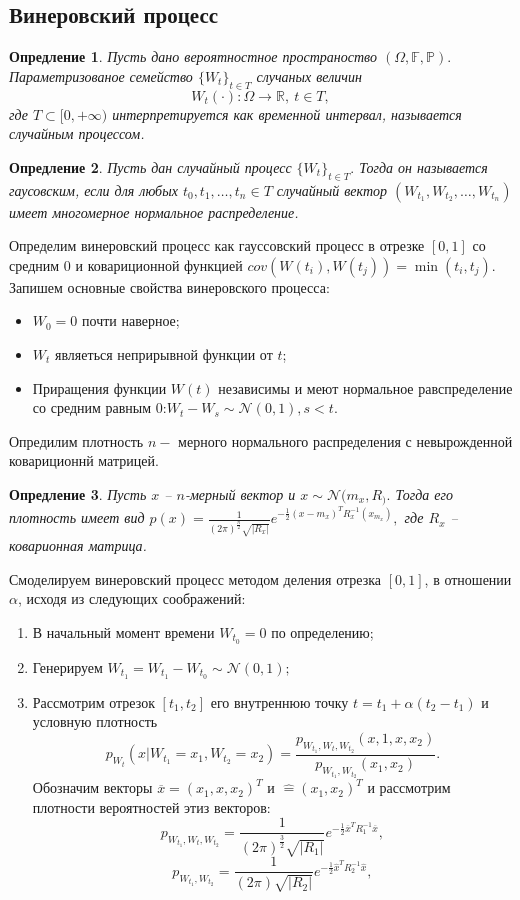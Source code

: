 \documentclass[11pt]{article}
\newtheorem{definition}{Опредление}
\numberwithin{equation}{section}
\begin{document}
\subsection{Винеровский процесс}
\begin{definition}
  Пусть дано вероятностное пространоство $(\Omega, \mathbb{F}, \mathbb{P}).$
  Параметризованое семейство $\{ W_t\}_{t \in T}$ случаных величин 
  $$ W_t(\cdot) : \Omega \to \mathbb{R}, \ t \in T,$$
  где $T \subset [0, +\infty)$ интерпретируется как временной интервал, называется случайным процессом.
\end{definition}
\begin{definition}
  Пусть дан случайный процесс $\{ W_t\}_{t \in T}.$ Тогда он называется гаусовским, если для любых 
  $t_0, t_1, \dots, t_n \in T$ случайный вектор $(W_{t_1}, W_{t_2}, \dots, W_{t_n})$ имеет многомерное нормальное распределение.
\end{definition}
Определим винеровский процесс как гауссовский процесс в отрезке $[0,1]$ со средним 0 
и ковариционной функцией $cov(W(t_i),W(t_j)) = \min(t_i,t_j).$
Запишем основные свойства винеровского процесса:
\begin{itemize}
  \item $W_0 = 0$ почти наверное;
  \item $W_t$ являеться неприрывной функции от $t$;
  \item Приращения функции $W(t)$ независимы и меют нормальное равспределение со средним равным 0:$W_t - W_s \sim \mathcal{N}(0,1), s<t.$
\end{itemize}
Опредилим плотность $n-$ мерного нормального распределения с невырожденной ковариционнй матрицей.
\begin{definition}
  Пусть $x$ -- $n$-мерный вектор и $x \sim \mathcal{N}(m_x,R_).$ Тогда его плотность имеет вид
  $p(x) = \frac{1}{(2\pi)^{\frac{n}{2}} \sqrt{|R_x|}} e^{-\frac{1}{2}(x-m_x)^{T} R_x^{-1} (x_m_x)},$
  где $R_x$ -- коварионная матрица.
\end{definition}
Смоделируем винеровский процесс методом деления отрезка $[0, 1]$, в отношении $\alpha$, исходя из следующих соображений:
\begin{enumerate}
  \item В начальный момент времени $W_{t_0} = 0$ по определению;
  \item Генерируем $W_{t_1} = W_{t_1}- W_{t_0} \sim \mathcal{N}(0,1);$
  \item Рассмотрим отрезок $[t_1,t_2]$ его внутреннюю точку $t = t_1+\alpha(t_2-t_1)$ и условную плотность
  $$p_{W_t} (x | W_{t_1} = x_1, W_{t_2} = x_2) = \frac{p_{W_{t_1}, W_t, W_{t_2} } (x,1,x,x_2)}{ p_{W_{t_1}, W_{t_2}} (x_1, x_2) }.$$
  Обозначим векторы $\overline{x} = (x_1, x, x_2)^{T}$ и $\hat = (x_1, x_2)^T$
  и рассмотрим плотности вероятностей этиз векторов:
  $$ p_{W_{t_1}, W_t, W_{t_2}} = \frac{1}{(2\pi)^{\frac{3}{2}} \sqrt{|R_1|}} e^{-\frac{1}{2} \overline{x}^T R_1^{-1}\overline{x}},$$
  $$ p_{W_{t_1}, W_{t_2}} = \frac{1}{(2\pi)\sqrt{|R_2|}} e^{-\frac{1}{2} \hat{x}^T R_2^{-1}\hat{x}},$$
\end{enumerate}
\end{document}
